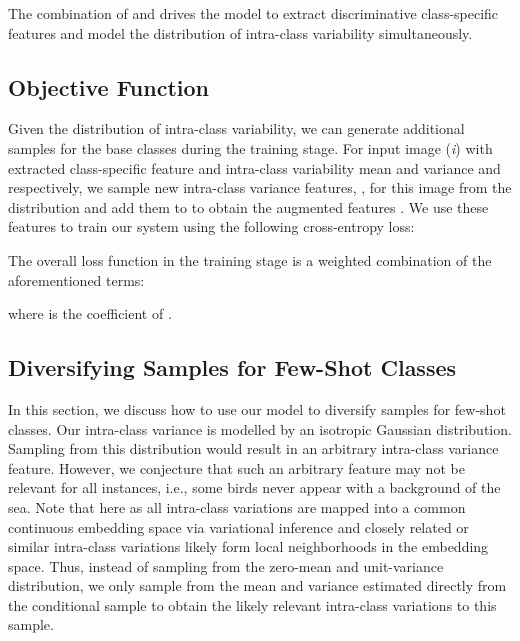\documentclass[10pt,twocolumn,letterpaper]{article}
\begin{document}
    \footnotesize
      
     \normalsize 
     \noindent The combination of  and  drives the model to extract discriminative class-specific features
     and model the distribution of intra-class variability simultaneously.


\subsection{Objective Function}
        Given the distribution of intra-class variability, we can generate additional samples for the base classes during the training stage. For input image (\textit{i}) with extracted class-specific feature  and  intra-class variability mean and variance  and  respectively, we sample new intra-class variance features, ,   for this image from the distribution  and add them to  to obtain the augmented features .
We use these features to train our system using the following cross-entropy loss:
\begin{comment}
         
\end{comment}    
 


  
      The overall loss function in the training stage is a weighted combination of the aforementioned terms:
      
      
\noindent where  is the coefficient of .



\subsection{Diversifying Samples for Few-Shot Classes} 
\label{transfer_learning_intra_class_variance}
In this section, we discuss how to use our model to diversify samples for few-shot classes.
Our intra-class variance is modelled by an isotropic Gaussian distribution. Sampling from this distribution would result in an arbitrary intra-class variance feature. However, we conjecture that such an arbitrary feature may not be relevant for all instances, i.e., some birds never appear with a background of the sea. 
Note that here as all intra-class variations are mapped into a common continuous embedding space via variational inference and closely related or similar intra-class variations likely form local neighborhoods in the embedding space. Thus,
instead of sampling from the zero-mean and unit-variance distribution, we only sample from the mean and variance estimated directly from the conditional sample to obtain the likely relevant intra-class variations to this sample. 
\end{document}

